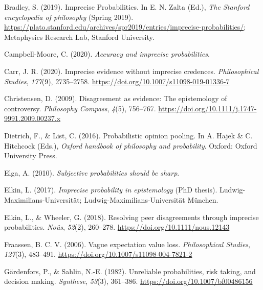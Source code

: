 \documentclass[
  10pt,
  dvipsnames,enabledeprecatedfontcommands]{scrartcl}
\newlength{\cslhangindent}
\newlength{\cslentryspacingunit} %
\newenvironment{CSLReferences}[2] %
 {%
  \setlength{\parindent}{0pt}
  \ifodd #1
  \let\oldpar\par
  \def\par{\hangindent=\cslhangindent\oldpar}
  \fi
  \setlength{\parskip}{#2\cslentryspacingunit}
 }%
 {}
\begin{document}
\hypertarget{refs}{}
\begin{CSLReferences}{1}{0}
\leavevmode{}%
Bradley, S. (2019). {Imprecise Probabilities}. In E. N. Zalta (Ed.),
\emph{The {Stanford} encyclopedia of philosophy} ({S}pring 2019).
\url{https://plato.stanford.edu/archives/spr2019/entries/imprecise-probabilities/};
Metaphysics Research Lab, Stanford University.

\leavevmode{}%
Campbell-Moore, C. (2020). \emph{Accuracy and imprecise probabilities}.

\leavevmode{}%
Carr, J. R. (2020). Imprecise evidence without imprecise credences.
\emph{Philosophical Studies}, \emph{177}(9), 2735--2758.
\url{https://doi.org/10.1007/s11098-019-01336-7}

\leavevmode{}%
Christensen, D. (2009). Disagreement as evidence: The epistemology of
controversy. \emph{Philosophy Compass}, \emph{4}(5), 756--767.
\url{https://doi.org/10.1111/j.1747-9991.2009.00237.x}

\leavevmode{}%
Dietrich, F., \& List, C. (2016). Probabilistic opinion pooling. In A.
Hajek \& C. Hitchcock (Eds.), \emph{Oxford handbook of philosophy and
probability}. Oxford: Oxford University Press.

\leavevmode{}%
Elga, A. (2010). \emph{Subjective probabilities should be sharp}.

\leavevmode{}%
Elkin, L. (2017). \emph{Imprecise probability in epistemology} (PhD
thesis). Ludwig-Maximilians-Universit{ä}t;
Ludwig-Maximilians-Universität München.

\leavevmode{}%
Elkin, L., \& Wheeler, G. (2018). Resolving peer disagreements through
imprecise probabilities. \emph{Noûs}, \emph{52}(2), 260--278.
\url{https://doi.org/10.1111/nous.12143}

\leavevmode{}%
Fraassen, B. C. V. (2006). Vague expectation value loss.
\emph{Philosophical Studies}, \emph{127}(3), 483--491.
\url{https://doi.org/10.1007/s11098-004-7821-2}

\leavevmode{}%
Gärdenfors, P., \& Sahlin, N.-E. (1982). Unreliable probabilities, risk
taking, and decision making. \emph{Synthese}, \emph{53}(3), 361--386.
\url{https://doi.org/10.1007/bf00486156}


\end{CSLReferences}
\end{document}
